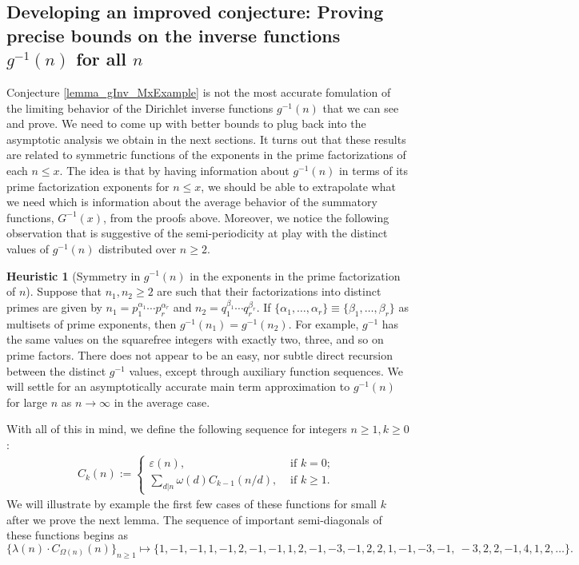 \documentclass[11pt,reqno,a4letter]{article}
\numberwithin{figure}{section}
\numberwithin{table}{section}
\newcommand{\seqnum}[1]{\href{http://oeis.org/#1}{\color{ProcessBlue}{\underline{#1}}}}
\theoremstyle{plain}
\numberwithin{theorem}{section}
\theoremstyle{definition}
\newtheorem{heuristic}[theorem]{Heuristic}
\begin{document}
\subsection{Developing an improved conjecture: 
            Proving precise bounds on the inverse functions $g^{-1}(n)$ for all $n$} 

Conjecture \ref{lemma_gInv_MxExample} is not the most accurate fomulation of the limiting behavior of the 
Dirichlet inverse functions $g^{-1}(n)$ that we can see and prove. 
We need to come up with better bounds to plug back into the asymptotic analysis we obtain in the 
next sections. It turns out that these results are related to symmetric functions of the exponents in the 
prime factorizations of each $n \leq x$. The idea is that by having information about $g^{-1}(n)$ 
in terms of its prime factorization exponents for $n \leq x$, we should be able to extrapolate 
what we need which is information about the average behavior of the summatory functions, $G^{-1}(x)$, 
from the proofs above. 
Moreover, we notice the following observation that is suggestive of the semi-periodicity at play 
with the distinct values of $g^{-1}(n)$ distributed over $n \geq 2$.

\begin{heuristic}[Symmetry in $g^{-1}(n)$ in the exponents in the prime factorization of $n$] 
Suppose that $n_1, n_2 \geq 2$ are such that their factorizations into distinct primes are 
given by $n_1 = p_1^{\alpha_1} \cdots p_r^{\alpha_r}$ and $n_2 = q_1^{\beta_1} \cdots q_r^{\beta_r}$. 
If $\{\alpha_1, \ldots, \alpha_r\} \equiv \{\beta_1, \ldots, \beta_r\}$ as multisets of prime exponents, 
then $g^{-1}(n_1) = g^{-1}(n_2)$. For example, $g^{-1}$ has the same values on the squarefree integers 
with exactly two, three, and so on prime factors. There does not appear to be an easy, nor subtle 
direct recursion between the distinct $g^{-1}$ values, except through auxiliary function sequences. 
We will settle for an asymptotically accurate main term approximation to $g^{-1}(n)$ for large $n$ as 
$n \rightarrow \infty$ in the average case. 
\end{heuristic} 

With all of this in mind, we define the following sequence for integers $n \geq 1, k \geq 0$: 
\begin{align} 
C_k(n) := \begin{cases} 
     \varepsilon(n), & \text{ if $k = 0$; } \\ 
     \sum\limits_{d|n} \omega(d) C_{k-1}(n/d), & \text{ if $k \geq 1$. } 
     \end{cases} 
\end{align} 
We will illustrate by example the first few cases of these functions for small $k$ after we prove 
the next lemma. 
The sequence of important semi-diagonals of these functions begins as 
\cite[\seqnum{A008480}]{OEIS} 
\[
\{\lambda(n) \cdot C_{\Omega(n)}(n) \}_{n \geq 1} \mapsto \{
     1, -1, -1, 1, -1, 2, -1, -1, 1, 2, -1, -3, -1, 2, 2, 1, -1, -3, -1, \
     -3, 2, 2, -1, 4, 1, 2, \ldots \}. 
\]
\end{document}
